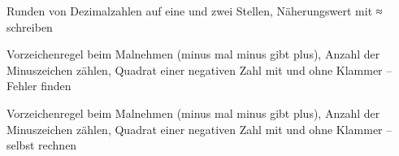 \begin{aufgabe}{Runden von Dezimalzahlen auf eine und zwei Stellen, Näherungswert mit ≈ schreiben}
\end{aufgabe}

\begin{aufgabe}{Vorzeichenregel beim Malnehmen (minus mal minus gibt plus), Anzahl der Minuszeichen zählen, Quadrat einer negativen Zahl mit und ohne Klammer – Fehler finden}
\end{aufgabe}

\begin{aufgabe}{Vorzeichenregel beim Malnehmen (minus mal minus gibt plus), Anzahl der Minuszeichen zählen, Quadrat einer negativen Zahl mit und ohne Klammer – selbst rechnen}
\end{aufgabe}
